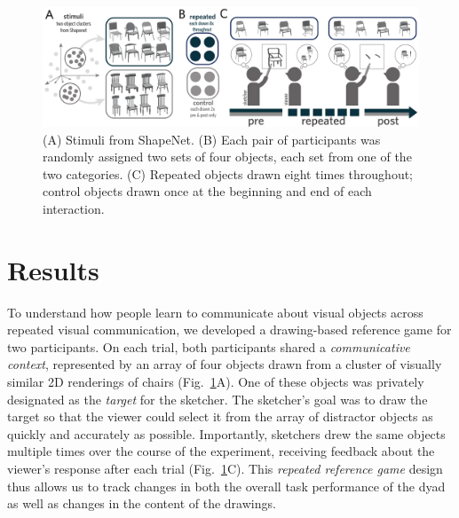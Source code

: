 \documentclass[11pt,letterpaper]{article}
\begin{document}
\begin{figure}
\begin{center}
\includegraphics[width=1\linewidth]{figures/task_stimuli.pdf}
\caption{(A) Stimuli from ShapeNet. (B) Each pair of participants was randomly assigned two sets of four objects, each set from one of the two categories. (C) Repeated objects drawn eight times throughout; control objects drawn once at the beginning and end of each interaction.}
\label{task_stimuli}
\end{center}
\end{figure}


\section{Results}

To understand how people learn to communicate about visual objects across repeated visual communication, we developed a drawing-based reference game for two participants.
On each trial, both participants shared a \textit{communicative context}, represented by an array of four objects drawn from a cluster of visually similar 2D renderings of chairs (Fig.~\ref{task_stimuli}A).
One of these objects was privately designated as the \emph{target} for the sketcher.
The sketcher's goal was to draw the target so that the viewer could select it from the array of distractor objects as quickly and accurately as possible.
Importantly, sketchers drew the same objects multiple times over the course of the experiment, receiving feedback about the viewer's response after each trial  (Fig.~\ref{task_stimuli}C).
This \emph{repeated reference game} design thus allows us to track changes in both the overall task performance of the dyad as well as changes in the content of the drawings.
\end{document}
